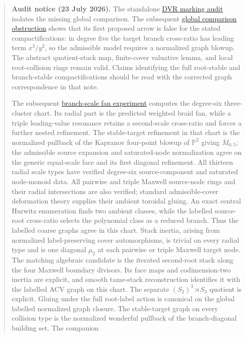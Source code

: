 \documentclass[11pt]{article}
\begin{document}
\begin{quote}
\textbf{Audit notice (23 July 2026).}
The standalone \href{dvr-marking-audit.tex}{DVR marking audit} isolates the
missing global comparison.  The subsequent
\href{global-comparison-obstruction.tex}{global comparison obstruction}
shows that its first proposed arrow is false for the stated compactifications:
in degree five the target branch cross-ratio has leading term $x^3/y^2$, so
the admissible model requires a normalized graph blowup.  The abstract
quotient-stack map, finite-cover valuative lemma, and local root-collision
rings remain valid.  Claims identifying the full root-stable and
branch-stable compactifications should be read with the corrected graph
correspondence in that note.

The subsequent
\href{../../extended-geometry/BRANCH_SCALE_FAN.md}{branch-scale fan
experiment} computes the degree-six three-cluster chart.  Its radial part is
the predicted weighted braid fan, while a triple leading-value resonance
retains a second-scale cross-ratio and forces a further nested refinement.
The stable-target refinement in that chart is the normalized pullback of the
Kapranov four-point blowup of $\mathbb P^2$ giving $\overline M_{0,5}$; the
admissible source expansion and saturated-node normalization agree on the
generic equal-scale face and its first diagonal refinement.  All thirteen
radial scale types have verified degree-six source-component and saturated
node-monoid data.  All pairwise and triple Maxwell source-node rings and
their radial intersections are also verified; standard admissible-cover
deformation theory supplies their ambient toroidal gluing.  An exact central
Hurwitz enumeration finds two ambient classes, while the labelled
source-root cross-ratio selects the polynomial class as a reduced branch.
Thus the labelled coarse graphs agree in this chart.  Stack inertia, arising
from normalized label-preserving cover automorphisms, is trivial on every
radial type and is one diagonal $\mu_2$ at each pairwise or triple Maxwell
target node.  The matching algebraic candidate is the iterated second-root
stack along the four Maxwell boundary divisors.  Its face maps and
codimension-two inertia are explicit, and smooth tame-stack reconstruction
identifies it with the labelled ACV graph on this chart.  The separate
$(S_2)^3\rtimes S_3$ quotient is explicit.  Gluing under the full root-label
action is canonical on the global labelled normalized graph closure.  The
stable-target graph on every collision type is the normalized wonderful
pullback of the branch-diagonal building set.  The companion

\end{quote}
\end{document}
